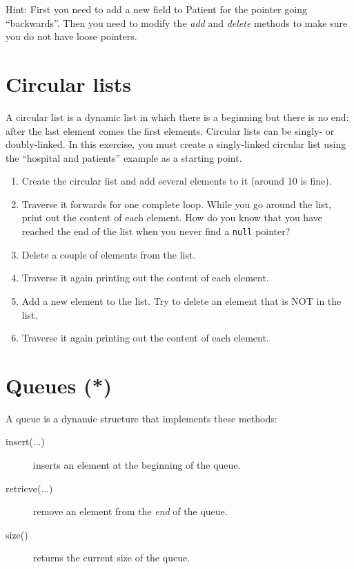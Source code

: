 \documentclass{article}
\begin{document}
Hint: First you need to add a new field to Patient for the pointer
going ``backwards''. Then you need to modify the \emph{add} and
\emph{delete} methods to make sure you do not have loose pointers. 

\section{Circular lists}
\label{sec:circular-lists}

A circular list is a dynamic list in which there is a beginning but
there is no end: after the last element comes the first
elements. Circular lists can be singly- or doubly-linked. In this
exercise, you must create a singly-linked circular list using the
``hospital and patients'' example as a starting point.

\begin{enumerate}
\item Create the circular list and add several elements to it
  (around 10 is fine). 
\item Traverse it forwards for one complete loop. While you go around
  the list, print out the content of each element. How do you know
  that you have reached the end of the list when you never find a
  \verb+null+ pointer? 
\item Delete a couple of elements from the list. 
\item Traverse it again printing out the content of
  each element.
\item Add a new element to the list. Try to delete an element that is
  NOT in the list. 
\item Traverse it again printing out the content of
  each element.
\end{enumerate}

\section{Queues (*)}
\label{sec:queues}

A queue is a dynamic structure that implements these methods: 

\begin{description}
\item[insert(...)] inserts an element at the beginning of the queue.
\item[retrieve(...) ] remove an element from the \emph{end} of the queue.
\item[size() ] returns the current size of the queue. 
\end{description}
\end{document}
